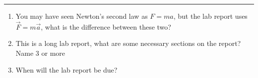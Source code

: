 \documentclass[11pt]{article}
\begin{document}
\Large

\medskip\hrule\bigskip\bigskip
{}
\begin{enumerate}

\item You may have seen Newton's second law as $F=ma$, but the lab report uses $\vec{F}=m\vec{a}$, what is the difference between these two?
  \vspace*{0.27\textheight}
\item This is a long lab report, what are some necessary sections on the report? Name 3 or more
  \vspace*{0.27\textheight}
\item When will the lab report be due?
  
\end{enumerate}
\end{document}
